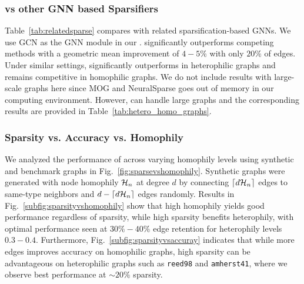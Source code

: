 \subsubsection{\sgs vs other GNN based Sparsifiers}
\label{subsubsec:relatedsparsifier}
Table~\ref{tab:relatedsparse} compares \sgs with related sparsification-based GNNs. We use GCN as the GNN module in our \sgs. 
\sgs significantly outperforms competing methods with a geometric mean improvement of $4-5\%$ with only $20\%$ of edges. Under similar settings, \sgs significantly outperforms in heterophilic graphs and remains competitive in homophilic graphs.
We do not include results with large-scale graphs here since MOG and NeuralSparse goes out of memory in our computing environment. However, \sgs can handle large graphs and the corresponding results are provided in Table~\ref{tab:hetero_homo_graphs}. 



\subsubsection{Sparsity vs. Accuracy vs. Homophily}  
We analyzed the performance of \sgs across varying homophily levels using synthetic and benchmark graphs in Fig.~\ref{fig:sparsevshomophily}. Synthetic graphs were generated with node homophily ${\mathcal{H}}_n$ at degree $d$ by connecting $\lceil d{\mathcal{H}}_n \rceil$ edges to same-type neighbors and $d-\lceil d{\mathcal{H}}_n \rceil$ edges randomly. Results in Fig.~\ref{subfig:sparsityvshomophily} show that high homophily yields good performance regardless of sparsity, while high sparsity benefits heterophily, with optimal performance seen at $30\%-40\%$ edge retention for heterophily levels $0.3-0.4$. Furthermore, Fig.~\ref{subfig:sparsityvsaccuray} indicates that while more edges improves accuracy on homophilic graphs, high sparsity can be advantageous on heterophilic graphs such as \texttt{reed98} and \texttt{amherst41}, where we observe best performance at $\sim20\%$ sparsity.

